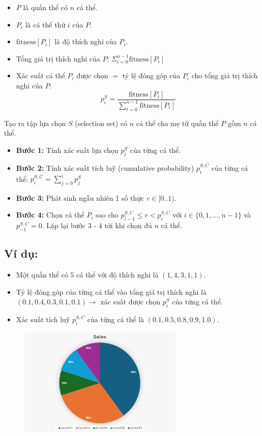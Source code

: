 \documentclass{book}
\begin{document}
\begin{itemize}
    \item $P$ là quần thể có $n$ cá thể.
    \item $P_i$ là cá thể thứ $i$ của $P$.
    \item $\text{fitness}[P_i]$ là độ thích nghi của $P_i$.
    \item Tổng giá trị thích nghi của $P$: $\Sigma^{n-1}_{i=0} \text{fitness}[P_i]$
    \item Xác suất cá thể $P_i$ được chọn $= $ tỷ lệ đóng góp của $P_i$ cho tổng giá trị thích nghi của $P$:
    $$ p_i^S = \frac{\text{fitness}[P_i]}{\sum_{t=0}^{n-1} \text{fitness}[P_t]} $$
\end{itemize}

Tạo ra tập lựa chọn $S$ (selection set) có $n$ cá thể cha mẹ từ quần thể $P$ gồm $n$ cá thể.
\begin{itemize}
    \item \textbf{Bước 1:} Tính xác suất lựa chọn $p_i^S$ của từng cá thể.
    \item \textbf{Bước 2:} Tính xác suất tích luỹ (cumulative probability) $p_i^{S,C}$ của từng cá thể: $p_i^{S,C} = \sum_{j=0}^{i} p_j^S$
    \item \textbf{Bước 3:} Phát sinh ngẫu nhiên 1 số thực $r \in [0..1)$.
    \item \textbf{Bước 4:} Chọn cá thể $P_i$ sao cho $p_{i-1}^{S,C} \le r < p_i^{S,C}$ với $i \in \{0,1, \ldots, n-1\}$ và $p_{-1}^{S,C} = 0$.
    Lặp lại bước 3 - 4 tới khi chọn đủ $n$ cá thể.
\end{itemize}

\subsection*{Ví dụ:} %
\begin{itemize}
    \item Một quần thể có 5 cá thể với độ thích nghi là $(1, 4, 3, 1, 1)$.
    \item Tỷ lệ đóng góp của từng cá thể vào tổng giá trị thích nghi là $(0.1, 0.4, 0.3, 0.1, 0.1) \rightarrow$ xác suất được chọn $p_i^S$ của từng cá thể.
    \item Xác suất tích luỹ $p_i^{S,C}$ của từng cá thể là $(0.1, 0.5, 0.8, 0.9, 1.0)$.
\end{itemize}

\begin{figure}[H]
    \centering
    \includegraphics[width=0.7\textwidth]{images/pie_chart.png} 
\end{figure}
\end{document}
